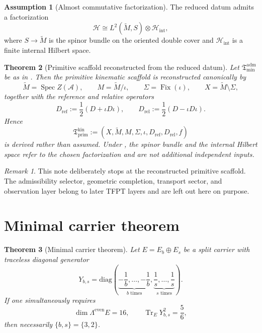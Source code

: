 \documentclass[11pt,a4paper]{article}
\newtheorem{theorem}{Theorem}[section]
\theoremstyle{definition}
\newtheorem{assumption}[theorem]{Assumption}
\theoremstyle{remark}
\newtheorem*{remark}{Remark}
\DeclareMathOperator{\Spec}{Spec}
\DeclareMathOperator{\Fix}{Fix}
\DeclareMathOperator{\tr}{Tr}
\newcommand{\Seam}{\Sigma}
\newcommand{\inv}{\iota}
\newcommand{\Tmin}{\mathfrak T_{\mathrm{min}}}
\newcommand{\Tprim}{\mathfrak T_{\mathrm{prim}}}
\numberwithin{equation}{section}
\begin{document}
\begin{assumption}[Almost commutative factorization]
\label{ass:factorization}
The reduced datum admits a factorization
\[
\mathcal H \cong L^2(\widetilde M,S)\otimes \mathcal H_{\mathrm{int}},
\]
where $S\to \widetilde M$ is the spinor bundle on the oriented double cover and
$\mathcal H_{\mathrm{int}}$ is a finite internal Hilbert space.
\end{assumption}

\begin{theorem}[Primitive scaffold reconstructed from the reduced datum]
\label{thm:primitive-scaffold}
Let $\Tmin^{\mathrm{adm}}$ be as in . Then the primitive kinematic scaffold is reconstructed canonically by
\[
\widetilde M = \Spec Z(\mathcal A),
\qquad
M = \widetilde M/\inv,
\qquad
\Seam = \Fix(\inv),
\qquad
X = \widetilde M \setminus \Seam,
\]
together with the reference and relative operators
\[
D_{\mathrm{ref}} := \frac12(D+\inv D\inv),
\qquad
D_{\mathrm{rel}} := \frac12(D-\inv D\inv).
\]
Hence
\[
\Tprim^{\mathrm{kin}}
:=
(X,\widetilde M,M,\Seam,\inv,D_{\mathrm{ref}},D_{\mathrm{rel}},f)
\]
is derived rather than assumed. Under , the spinor bundle and the internal
Hilbert space refer to the chosen factorization and are not additional independent inputs.
\end{theorem}

\begin{remark}
This note deliberately stops at the reconstructed primitive scaffold. The admissibility selector,
geometric completion, transport sector, and observation layer belong to later TFPT layers and are
left out here on purpose.
\end{remark}

\section{Minimal carrier theorem}

\begin{theorem}[Minimal carrier theorem]
\label{thm:minimal-carrier}
Let $E = E_b \oplus E_s$ be a split carrier with traceless diagonal generator
\[
Y_{b,s}
=
\mathrm{diag}\!\left(
\underbrace{-\frac1b,\ldots,-\frac1b}_{b\text{ times}},
\underbrace{\frac1s,\ldots,\frac1s}_{s\text{ times}}
\right).
\]
If one simultaneously requires
\[
\dim \Lambda^{\mathrm{even}} E = 16,
\qquad
\tr_E Y_{b,s}^2 = \frac56,
\]
then necessarily $\{b,s\} = \{3,2\}$.
\end{theorem}
\end{document}

